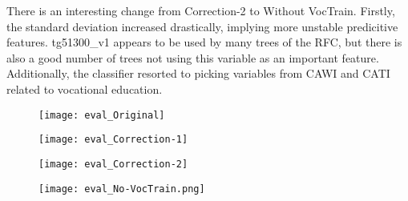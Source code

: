 There is an interesting change from Correction-2 to Without VocTrain. Firstly, the standard deviation increased drastically, implying more unstable predicitive features. tg51300\_v1 appears to be used by many trees of the RFC, but there is also a good number of trees not using this variable as an important feature. Additionally, the classifier resorted to picking variables from CAWI and CATI related to vocational education.
\begin{figure}
    \centering
    \texttt{[image: eval\_Original]}
    \label{fig:old_feature_importances}
\end{figure}
\begin{figure}
    \centering
    \texttt{[image: eval\_Correction-1]}
    \label{fig:int_feature_importances}
\end{figure}
\begin{figure}
    \centering
    \texttt{[image: eval\_Correction-2]}
    \label{fig:newer_feature_importances}
\end{figure}
\begin{figure}
    \centering
    \texttt{[image: eval\_No-VocTrain.png]}
    \label{fig:no_voctrain_feature_importances}
\end{figure}

